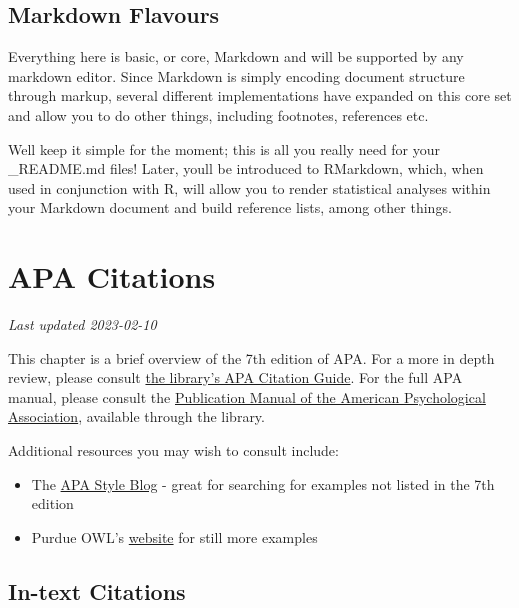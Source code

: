 \documentclass[
]{book}
\providecommand{\tightlist}{%
  \setlength{\itemsep}{0pt}\setlength{\parskip}{0pt}}
\begin{document}
\hypertarget{markdown-flavours}{%
\section{Markdown Flavours}\label{markdown-flavours}}

Everything here is basic, or core, Markdown and will be supported by any markdown editor. Since Markdown is simply encoding document structure through markup, several different implementations have expanded on this core set and allow you to do other things, including footnotes, references etc.

We\textquotesingle ll keep it simple for the moment; this is all you really need for your \_README.md files! Later, you\textquotesingle ll be introduced to RMarkdown, which, when used in conjunction with R, will allow you to render statistical analyses within your Markdown document and build reference lists, among other things.

\hypertarget{apa-citations}{%
\chapter{APA Citations}\label{apa-citations}}

\emph{Last updated 2023-02-10}

This chapter is a brief overview of the 7th edition of APA. For a more in depth review, please consult \href{https://guides.library.ubc.ca/apacitationstyle}{the library's APA Citation Guide}. For the full APA manual, please consult the \href{http://resolve.library.ubc.ca/cgi-bin/catsearch?bid=10057275}{Publication Manual of the American Psychological Association}, available through the library.

Additional resources you may wish to consult include:

\begin{itemize}
\tightlist
\item
  The \href{https://apastyle.apa.org/blog/}{APA Style Blog} - great for searching for examples not listed in the 7th edition
\item
  Purdue OWL's \href{https://owl.purdue.edu/owl/research_and_citation/apa_style/apa_formatting_and_style_guide/general_format.html}{website} for still more examples
\end{itemize}

\hypertarget{in-text-citations}{%
\section{In-text Citations}\label{in-text-citations}}
\end{document}
